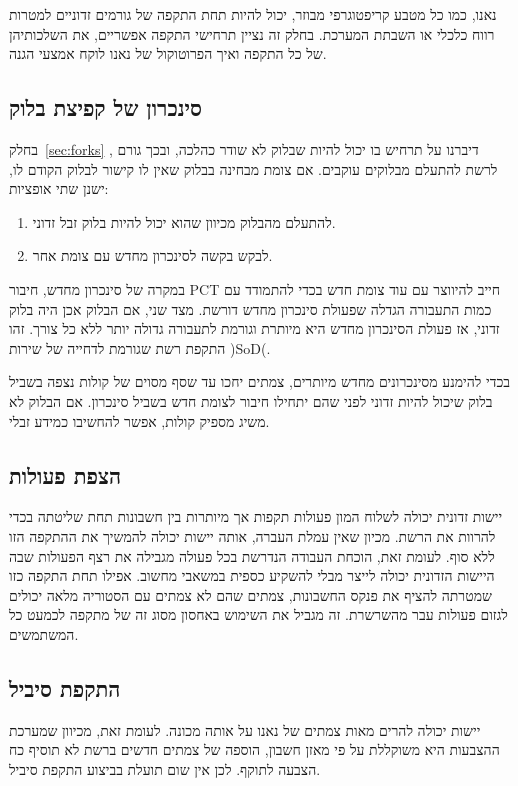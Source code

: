 נאנו, כמו כל מטבע קריפטוגרפי מבוזר, יכול להיות תחת התקפה של גורמים זדוניים למטרות רווח כלכלי או השבתת המערכת. בחלק זה נציין תרחישי התקפה אפשריים, את השלכותיהן של כל התקפה ואיך הפרוטוקול של נאנו לוקח אמצעי הגנה.

\subsection{סינכרון של קפיצת בלוק}
בחלק~\ref{sec:forks}
, דיברנו על תרחיש בו יכול להיות שבלוק לא שודר כהלכה, ובכך גורם לרשת להתעלם מבלוקים עוקבים. אם צומת מבחינה בבלוק שאין לו קישור לבלוק הקודם לו, ישנן שתי אופציות:
\begin{enumerate}
  \item להתעלם מהבלוק מכיוון שהוא יכול להיות בלוק זבל זדוני.
  \item לבקש בקשה לסינכרון מחדש עם צומת אחר.
\end{enumerate}
במקרה של סינכרון מחדש, חיבור PCT חייב להיווצר עם עוד צומת חדש בכדי להתמודד עם כמות התעבורה הגדלה שפעולת סינכרון מחדש דורשת. מצד שני, אם הבלוק אכן היה בלוק זדוני, אז פעולת הסינכרון מחדש היא מיותרת וגורמת לתעבורה גדולה יותר ללא כל צורך. זהו התקפת רשת שגורמת לדחייה של שירות )SoD(.


בכדי להימנע מסינכרונים מחדש מיותרים, צמתים יחכו עד שסף מסוים של קולות נצפה בשביל בלוק שיכול להיות זדוני לפני שהם יתחילו חיבור לצומת חדש בשביל סינכרון. אם הבלוק לא משיג מספיק קולות, אפשר להחשיבו כמידע זבלי.


\subsection{הצפת פעולות}\label{sec:transaction_flooding}
יישות זדונית יכולה לשלוח המון פעולות תקפות אך מיותרות בין חשבונות תחת שליטתה בכדי להרוות את הרשת. מכיון שאין עמלת העברה, אותה יישות יכולה להמשיך את ההתקפה הזו ללא סוף. לעומת זאת, הוכחת העבודה הנדרשת בכל פעולה מגבילה את רצף הפעולות שבה היישות הזדונית יכולה לייצר מבלי להשקיע כספית במשאבי מחשוב. אפילו תחת התקפה כזו שמטרתה להציף את פנקס החשבונות, צמתים שהם לא צמתים עם הסטוריה מלאה יכולים לגזום פעולות עבר מהשרשרת. זה מגביל את השימוש באחסון מסוג זה של מתקפה לכמעט כל המשתמשים.

\subsection{התקפת סיביל}
יישות יכולה להרים מאות צמתים של נאנו על אותה מכונה. לעומת זאת, מכיוון שמערכת ההצבעות היא משוקללת על פי מאזן חשבון, הוספה של צמתים חדשים ברשת לא תוסיף כח הצבעה לתוקף. לכן אין שום תועלת בביצוע התקפת סיביל.

